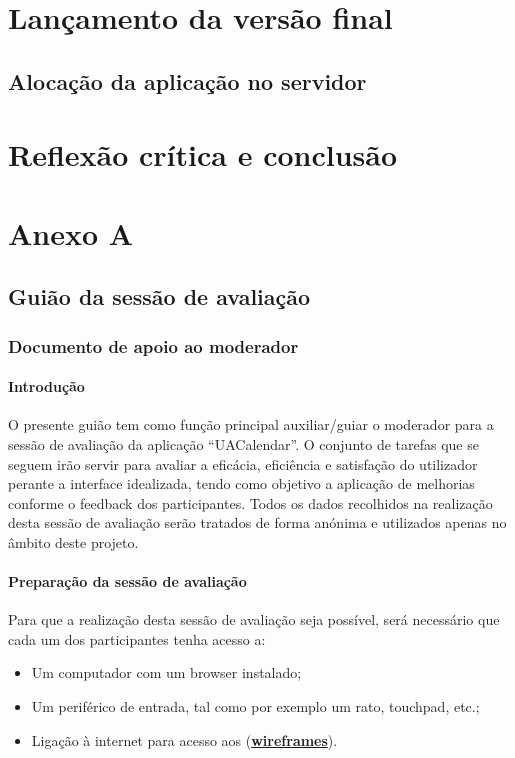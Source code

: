 \documentclass[11pt, twoside]{report}
\begin{document}
	\chapter{Lançamento da versão final}
	\section{Alocação da aplicação no servidor}
	
	
	\chapter{Reflexão crítica e conclusão}
	
	
	
	
	\pagestyle{empty}
	
	\chapter*{Anexo A}
	\section*{Guião da sessão de avaliação}
	\subsection*{Documento de apoio ao moderador}
	
	
	\subsubsection*{Introdução}
	O presente guião tem como função principal auxiliar/guiar o moderador para a sessão de avaliação da aplicação “UACalendar”. O conjunto de tarefas que se seguem irão servir para avaliar a eficácia, eficiência e satisfação do utilizador perante a interface idealizada, tendo como objetivo a aplicação de melhorias conforme o feedback dos participantes.
	Todos os dados recolhidos na realização desta sessão de avaliação serão tratados de forma anónima e utilizados apenas no âmbito deste projeto.
	
	
	\subsubsection*{Preparação da sessão de avaliação}
	Para que a realização desta sessão de avaliação seja possível, será necessário que cada um dos participantes tenha acesso a:
	
	\begin{itemize}
		\item Um computador com um browser instalado;
		\item Um periférico de entrada, tal como por exemplo um rato, touchpad, etc.;
		\item Ligação à internet para acesso aos (\href{https://www.figma.com/file/nhb5nnIrt3fdDoQhYpsN80/Calendario?node-id=9\%3A154}{\textbf{wireframes}}).
	\end{itemize}
	
\end{document}
